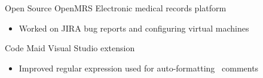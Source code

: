\cventry
    {Open Source}
    {OpenMRS}
    {Electronic medical records platform}
    {}
    {}
    {\begin{itemize}
        \item Worked on JIRA bug reports and configuring virtual machines
    \end{itemize}}
\cventry
    {}
    {Code Maid}
    {Visual Studio extension}
    {}
    {}
    {\begin{itemize}
        \item Improved regular expression used for auto-formatting \csharp\ comments
    \end{itemize}}